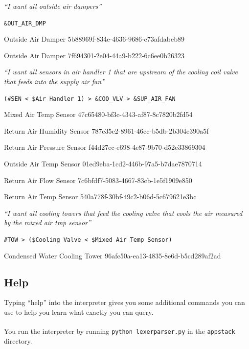 \documentclass{article}
\begin{document}
\begin{center}\emph{``I want all outside air dampers''}
	
	\verb+&OUT_AIR_DMP+
	
	Outside Air Damper 5b88969f-834e-4636-9686-c73afdabeb89
	
	Outside Air Damper 7f694301-2e04-44a9-b222-6c6ee0b26323
\end{center}

\begin{center}\emph{``I want all sensors in air handler 1 that are upstream of the cooling coil valve that feeds into the supply air fan''}
	
	\verb+(#SEN < $Air Handler 1) > &COO_VLV > &SUP_AIR_FAN+
	
	Mixed Air Temp Sensor 47c65480-bf3c-4343-af87-8c7820b2fd54
	
	Return Air Humidity Sensor 787c35e2-8961-46cc-b5db-2b304e390a5f
	
	Return Air Pressure Sensor f44d27ec-e698-4e87-9b70-d52e33869304
	
	Outside Air Temp Sensor 01ed9eba-1cd2-446b-97a5-b7dae7870714
	
	Return Air Flow Sensor 7c6bfdf7-5083-4667-83cb-1e5f1909e850

	Return Air Temp Sensor 540a778f-30bf-49c2-b06d-5c679621e3bc
\end{center}

\begin{center}\emph{``I want all cooling towers that feed the cooling valve that cools the air measured by the mixed air tmp sensor''}
	
	\verb+#TOW > ($Cooling Valve < $Mixed Air Temp Sensor)+
	
	Condensed Water Cooling Tower 96afc50a-ea13-4835-8e6d-b5cd289af2ad
\end{center}

\subsection{Help} %
\label{sub:help}
Typing ``help'' into the interpreter gives you some additional commands you can use to help you learn what exactly you can query.
\\\\
You run the interpreter by running \verb+python lexerparser.py+ in the \verb+appstack+ directory.
\end{document}
